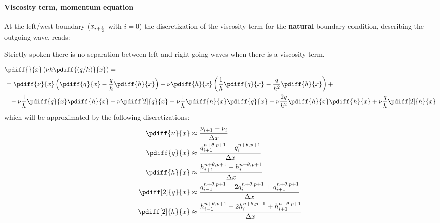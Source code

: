 \paragraph*{Viscosity term, momentum equation}
At the left/west boundary ($x_{i+\frac{1}{2}}$ with $i=0$) the discretization of the viscosity term for the \textbf{natural} boundary condition, describing the outgoing wave, reads:
%
\begin{Remark}
    \item Strictly spoken there is no separation between left and right going waves when there is a viscosity term.
\end{Remark}
\begin{align}
&\pdiff{}{x}\left(\nu h \pdiff{(q/h)}{x}\right) =
\\
& = \pdiff{\nu}{x} \left(\pdiff{q}{x} - \frac{q}{h}\pdiff{h}{x}\right) +
\nu \pdiff{h}{x} \left( \frac{1}{h} \pdiff{q}{x} - \frac{q}{h^2}\pdiff{h}{x} \right) +
\nonumber \\*
& \phantom{=}
- \nu \frac{1}{h}  \pdiff{q}{x} \pdiff{h}{x} +\nu \pdiff[2]{q}{x}
-  \nu \frac{1}{h} \pdiff{h}{x}\pdiff{q}{x} -
\nu \frac{2q}{h^2} \pdiff{h}{x}\pdiff{h}{x}
+
\nu \frac{q}{h} \pdiff[2]{h}{x}
\end{align}
which will be approximated by the following discretizations:
\begin{align}
    \pdiff{\nu}{x} & \approx \frac{\nu_{i+1} - \nu_{i}}{\Dx}
    \\
    \pdiff{q}{x} & \approx \frac{q^{n+\theta,p+1}_{i+1} - q^{n+\theta, p+1}_{i}}{\Dx}
    \\
    \pdiff{h}{x} & \approx \frac{h^{n+\theta,p+1}_{i+1} - h^{n+\theta, p+1}_{i}}{\Dx}
    \\
    \pdiff[2]{q}{x} & \approx \frac{q^{n+\theta,p+1}_{i-1} - 2 q^{n+\theta, p+1}_{i} + q^{n+\theta, p+1}_{i+1}}{\Dx}
    \\
    \pdiff[2]{h}{x} & \approx \frac{h^{n+\theta,p+1}_{i-1} - 2 h^{n+\theta, p+1}_{i} + h^{n+\theta, p+1}_{i+1}}{\Dx}
\end{align}



